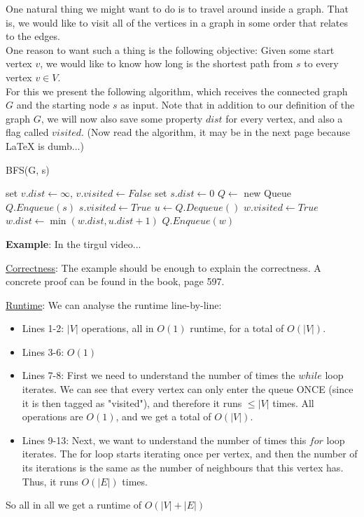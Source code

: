 \documentclass[12pt]{article}
\begin{document}
One natural thing we might want to do is to travel around inside a graph. That is, we would like to visit all of the vertices in a graph in some order that relates to the edges. \\ 
One reason to want such a thing is the following objective: Given some start vertex $v$, we would like to know how long is the shortest path from $s$ to every vertex $v\in V$. \\ 
For this we present the following algorithm, which receives the connected graph $G$ and the starting node $s$ as input. Note that in addition to our definition of the graph $G$, we will now also save some property $dist$ for every vertex, and also a flag called $visited$.  (Now read the algorithm, it may be in the next page because LaTeX is dumb...)
\begin{algorithm}
\caption{BFS(G, s)}
\begin{algorithmic}[1]
\State set $v.dist \leftarrow \infty$, $v.visited \leftarrow False$
\EndFor
\State set $s.dist\leftarrow 0$
\State $Q\leftarrow$ new Queue
\State $Q.Enqueue(s)$
\State $s.visited \leftarrow True$
\State $u\leftarrow Q.Dequeue()$
		\State $w.visited\leftarrow True$
		\State $w.dist\leftarrow \min(w.dist, u.dist+1)$
		\State $Q.Enqueue(w)$
	\EndIf
	\EndFor
\EndWhile
\end{algorithmic}
\end{algorithm} 

\textbf{Example}: In the tirgul video...

\underline{Correctness}: The example should be enough to explain the correctness. A concrete proof can be found in the book, page 597.


\underline{Runtime}: We can analyse the runtime line-by-line:
\begin{itemize}
\item Lines 1-2: $|V|$ operations, all in $O(1)$ runtime, for a total of $O(|V|)$.
\item Lines 3-6: $O(1)$
\item Lines 7-8: First we need to understand the number of times the $while$ loop iterates. We can see that every vertex can only enter the queue ONCE (since it is then tagged as "visited"), and therefore it runs $\leq |V|$ times. All operations are $O(1)$, and we get a total of $O(|V|)$. 
\item Lines 9-13: Next, we want to understand the number of times this $for$ loop iterates. 
The for loop starts iterating once per vertex, and then the number of its iterations is the same as the number of neighbours that this vertex has. Thus, it runs $O(|E|)$ times.
\end{itemize}
So all in all we get a runtime of $O(|V|+|E|)$
\end{document}
